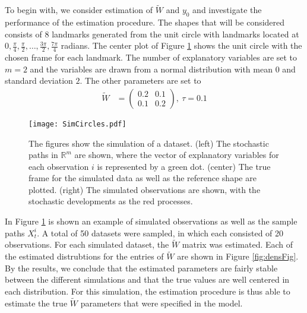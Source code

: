 \documentclass[runningheads,a4paper]{llncs}
\newcommand{\R}{\mathbb R}
\begin{document}
To begin with, we consider estimation of $\tilde{W}$ and $y_0$ and investigate the performance of the estimation procedure. The shapes that will be considered consists of $8$ landmarks generated from the unit circle with landmarks located at $0,\frac{\pi}{4},\frac{\pi}{2},\ldots,\frac{3\pi}{2},\frac{7\pi}{4}$ radians. The center plot of Figure \ref{fig:simCirc} shows the unit circle with the chosen frame for each landmark. The number of explanatory variables are set to $m=2$ and the variables are drawn from a normal distribution with mean $0$ and standard deviation $2$. The other parameters are set to
\begin{align}
    \tilde{W} &= \begin{pmatrix}
0.2 & 0.1 \\
0.1 & 0.2
\end{pmatrix}, \ \tau = 0.1
\label{eq:simT}
\end{align}

\begin{figure}
\centering
\texttt{[image: SimCircles.pdf]}
\caption{The figures show the simulation of a dataset. (left) The stochastic paths in $\R^m$ are shown, where the vector of explanatory variables for each observation $i$ is represented by a green dot. (center) The true frame for the simulated data as well as the reference shape are plotted. (right) The simulated observations are shown, with the stochastic developments as the red processes.}
\label{fig:simCirc}
\end{figure}

 In Figure \ref{fig:simCirc} is shown an example of simulated observations as well as the sample paths $X_t^i$. A total of 50 datasets were sampled, in which each consisted of 20 observations. For each simulated dataset, the $\tilde{W}$ matrix was estimated. Each of the estimated distrubtions for the entries of $\tilde{W}$ are shown in Figure \ref{fig:densFig}. By the results, we conclude that the estimated parameters are fairly stable between the different simulations and that the true values are well centered in each distribution. For this simulation, the estimation procedure is thus able to estimate the true $\tilde{W}$ parameters that were specified in the model.


\end{document}

